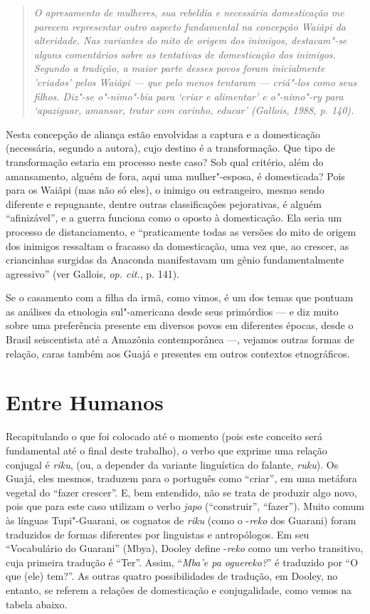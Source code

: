 \begin{quote}
\emph{O apresamento de mulheres, sua rebeldia e necessária domesticação me
parecem representar outro aspecto fundamental na concepção Waiãpi da
alteridade. Nas variantes do mito de origem dos inimigos, destacam"-se
alguns comentários sobre as tentativas de domesticação dos inimigos.
Segundo a tradição, a maior parte desses povos foram inicialmente
'criados' pelos Waiãpi --- que pelo menos tentaram --- criá"-los como seus
filhos. Diz"-se \emph{o"-nimo"-bia} para `criar e alimentar' e
\emph{o"-nimo"-ry} para `apaziguar, amansar, tratar com carinho, educar'
(Gallois, 1988, p. 140).}
\end{quote}

Nesta concepção de aliança estão envolvidas a captura e a domesticação
(necessária, segundo a autora), cujo destino é a transformação. Que tipo
de transformação estaria em processo neste caso? Sob qual critério, além
do amansamento, alguém de fora, aqui uma mulher"-esposa, é domesticada?
Pois para os Waiãpi (mas não só eles), o inimigo ou estrangeiro, mesmo
sendo diferente e repugnante, dentre outras classificações pejorativas,
é alguém ``afinizável'', e a guerra funciona como o oposto à domesticação.
Ela seria um processo de distanciamento, e ``praticamente todas as
versões do mito de origem dos inimigos ressaltam o fracasso da
domesticação, uma vez que, ao crescer, as criancinhas surgidas da
Anaconda manifestavam um gênio fundamentalmente agressivo'' (ver
Gallois, \emph{op. cit.}, p. 141).

Se o casamento com a filha da irmã, como vimos, é um dos temas que
pontuam as análises da etnologia sul"-americana desde seus primórdios --- e
diz muito sobre uma preferência presente em diversos povos em diferentes
épocas, desde o Brasil seiscentista até a Amazônia contemporânea ---,
vejamos outras formas de relação, caras também aos Guajá e presentes em
outros contextos etnográficos.

\section{Entre Humanos}\label{entre-humanos}

Recapitulando o que foi colocado até o momento (pois este conceito será
fundamental até o final deste trabalho), o verbo que exprime uma relação
conjugal é \emph{riku}, (ou, a depender da variante linguística do
falante, \emph{ruku}). Os Guajá, eles mesmos, traduzem para o português
como ``criar'', em uma metáfora vegetal do ``fazer crescer''. E, bem
entendido, não se trata de produzir algo novo, pois que para este caso
utilizam o verbo \emph{japo} (``construir'', ``fazer''). Muito comum às
línguas Tupi"-Guarani, os cognatos de \emph{riku} (como o -\emph{reko}
dos Guarani) foram traduzidos de formas diferentes por linguistas e
antropólogos. Em seu ``Vocabulário do Guarani'' (Mbya), Dooley define
-\emph{reko} como um verbo transitivo, cuja primeira tradução é ``Ter''.
Assim, ``\emph{Mba'e pa oguereko?}'' é traduzido por ``O que (ele) tem?''.
As outras quatro possibilidades de tradução, em Dooley, no entanto, se
referem a relações de domesticação e conjugalidade, como vemos na tabela
abaixo.

